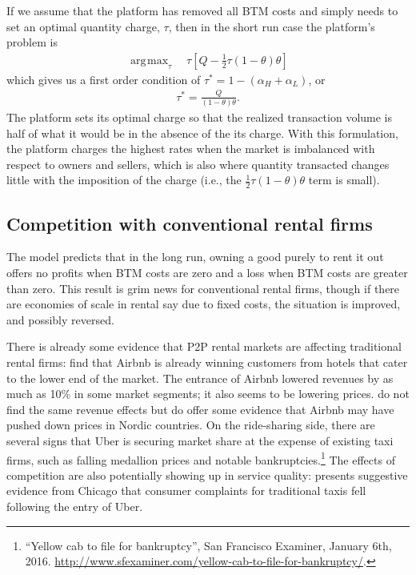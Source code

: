 \documentclass[11pt]{article}
\DeclareMathOperator*{\argmax}{\arg\!\max}
\begin{document}
If we assume that the platform has removed all BTM costs and simply needs to set an optimal quantity charge, $\tau$, then in the short run case the platform's problem is 
\begin{align}
  \argmax_{\tau} \quad \tau \left[Q - \frac{1}{2}\tau (1-\theta)\theta \right]
 \end{align}
which gives us a first order condition of $\tau^* = 1 - (\alpha_H + \alpha_L)$, or
\begin{align}
  \tau^* = \frac{Q}{(1-\theta)\theta}.  
\end{align}
The platform sets its optimal charge so that the realized transaction volume is half of what it would be in the absence of the its charge.
With this formulation, the platform charges the highest rates when the market is imbalanced with respect to owners and sellers, which is also where quantity transacted changes little with the imposition of the charge (i.e., the $\frac{1}{2} \tau (1-\theta)\theta$ term is small). 

\subsection{Competition with conventional rental firms}
The model predicts that in the long run, owning a good purely to rent it out offers no profits when BTM costs are zero and a loss when BTM costs are greater than zero.
This result is grim news for conventional rental firms, though if there are economies of scale in rental say due to fixed costs, the situation is improved, and possibly reversed.

There is already some evidence that P2P rental markets are affecting traditional rental firms: 
\cite{byers2013rise} find that Airbnb is already winning customers from hotels that cater to the lower end of the market.
The entrance of Airbnb lowered revenues by as much as 10\% in some market segments;
it also seems to be lowering prices. 
\cite{neeser2015does} do not find the same revenue effects but do offer some evidence that Airbnb may have pushed down prices in Nordic countries.
On the ride-sharing side, there are several signs that Uber is securing market share at the expense of existing taxi firms, such as falling medallion prices and notable bankruptcies.\footnote{
  ``Yellow cab to file for bankruptcy'', San Francisco Examiner, January 6th, 2016. \href{http://www.sfexaminer.com/yellow-cab-to-file-for-bankruptcy/}{http://www.sfexaminer.com/yellow-cab-to-file-for-bankruptcy/}.
}
The effects of competition are also potentially showing up in service quality:
\cite{wallsten2015} presents suggestive evidence from Chicago that consumer complaints for traditional taxis fell following the entry of Uber. 
\end{document}
